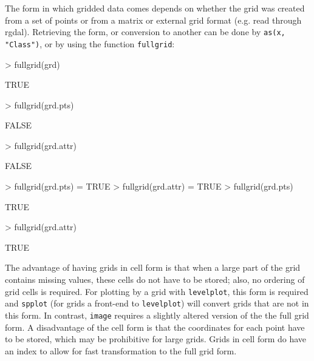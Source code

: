 \documentclass{article}
\begin{document}
The form in which gridded data comes depends on whether the grid was
created from a set of points or from a matrix or external grid format
(e.g. read through rgdal). Retrieving the form, or conversion to another
can be done by {\tt as(x, "Class")}, or by using the function {\tt fullgrid}:
\begin{Schunk}
\begin{Sinput}
> fullgrid(grd)
\end{Sinput}
\begin{Soutput}
[1] TRUE

\end{Soutput}
\begin{Sinput}
> fullgrid(grd.pts)
\end{Sinput}
\begin{Soutput}
[1] FALSE

\end{Soutput}
\begin{Sinput}
> fullgrid(grd.attr)
\end{Sinput}
\begin{Soutput}
[1] FALSE

\end{Soutput}
\begin{Sinput}
> fullgrid(grd.pts) = TRUE
> fullgrid(grd.attr) = TRUE
> fullgrid(grd.pts)
\end{Sinput}
\begin{Soutput}
[1] TRUE

\end{Soutput}
\begin{Sinput}
> fullgrid(grd.attr)
\end{Sinput}
\begin{Soutput}
[1] TRUE

\end{Soutput}
\end{Schunk}

The advantage of having grids in cell form is that when a large part
of the grid contains missing values, these cells do not have to be
stored; also, no ordering of grid cells is required. For plotting by
a grid with {\tt levelplot}, this form is required and {\tt spplot}
(for grids a front-end to {\tt levelplot}) will convert grids that are
not in this form.  In contrast, {\tt image} requires a slightly altered
version of the the full grid form.  A disadvantage of the cell form is
that the coordinates for each point have to be stored, which may be
prohibitive for large grids.  Grids in cell form do have an index to
allow for fast transformation to the full grid form.
\end{document}
